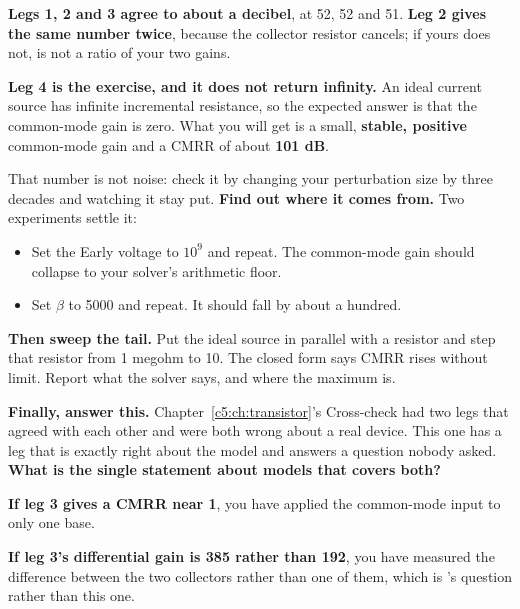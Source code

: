 \textbf{Legs 1, 2 and 3 agree to about a decibel}, at 52, 52 and 51. \textbf{Leg 2 gives the same number twice}, because the collector resistor cancels; if yours does not,  is not a ratio of your two gains.

\textbf{Leg 4 is the exercise, and it does not return infinity.} An ideal current source has infinite incremental resistance, so the expected answer is that the common-mode gain is zero. What you will get is a small, \textbf{stable, positive} common-mode gain and a CMRR of about \textbf{101 dB}.

That number is not noise: check it by changing your perturbation size by three decades and watching it stay put. \textbf{Find out where it comes from.} Two experiments settle it:

\begin{itemize}
  \item Set the Early voltage to $10^9$ and repeat. The common-mode gain should collapse to your solver's arithmetic floor.
  \item Set $\beta$ to 5000 and repeat. It should fall by about a hundred.
\end{itemize}
\textbf{Then sweep the tail.} Put the ideal source in parallel with a resistor and step that resistor from 1 megohm to 10. The closed form says CMRR rises without limit. Report what the solver says, and where the maximum is.

\textbf{Finally, answer this.} Chapter~\ref{c5:ch:transistor}'s Cross-check had two legs that agreed with each other and were both wrong about a real device. This one has a leg that is exactly right about the model and answers a question nobody asked. \textbf{What is the single statement about models that covers both?}

\textbf{If leg 3 gives a CMRR near 1}, you have applied the common-mode input to only one base.

\textbf{If leg 3's differential gain is 385 rather than 192}, you have measured the difference between the two collectors rather than one of them, which is 's question rather than this one.
